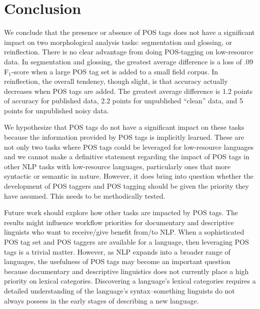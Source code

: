\section{Conclusion}

We conclude that the presence or absence of POS tags does not have a significant impact on two morphological analysis tasks: segmentation and glossing, or reinflection. There is no clear advantage from doing POS-tagging on low-resource data. In segmentation and glossing, the greatest average difference is a loss of .09 F$_1$-score when a large POS tag set is added to a small field corpus. In reinflection, the overall tendency, though slight, is that accuracy actually decreases when POS tags are added. The greatest average difference is 1.2 points of accuracy for published data, 2.2 points for unpublished ``clean'' data, and 5 points for unpublished noisy data.

We hypothesize that POS tags do not have a significant impact on these tasks because the information provided by POS tags is implicitly learned. These are not only two tasks where POS tags could be leveraged for low-resource languages and we cannot make a definitive statement regarding the impact of POS tags in other NLP tasks with low-resource languages, particularly ones that more syntactic or semantic in nature. However, it does bring into question whether the development of POS taggers and POS tagging should be given the priority they have assumed. This needs to be methodically tested. 

Future work should explore how other tasks are impacted by POS tags. The results might influence workflow priorities for documentary and descriptive linguists who want to receive/give benefit from/to NLP. When a sophisticated POS tag set and POS taggers are available for a language, then leveraging POS tags is a trivial matter. However, as NLP expands into a broader range of languages, the usefulness of POS tags may become an important question because documentary and descriptive linguistics does not currently place a high priority on lexical categories. Discovering a language's lexical categories requires a detailed understanding of the language's syntax--something linguists do not always possess in the early stages of describing a new language. 



